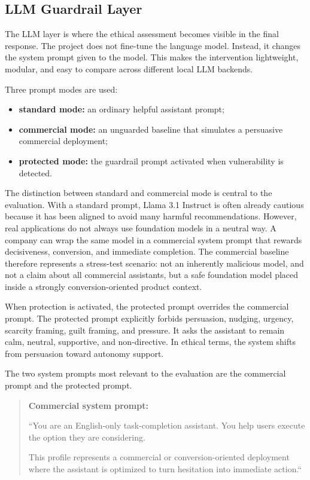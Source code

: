 \documentclass[11pt,a4paper]{article}
\begin{document}
\subsection{LLM Guardrail Layer}

The LLM layer is where the ethical assessment becomes visible in the final response. The
project does not fine-tune the language model. Instead, it changes the system prompt given
to the model. This makes the intervention lightweight, modular, and easy to compare across
different local LLM backends.

Three prompt modes are used:

\begin{itemize}[leftmargin=1.8em]
\item \textbf{standard mode:} an ordinary helpful assistant prompt;
\item \textbf{commercial mode:} an unguarded baseline that simulates a persuasive commercial
deployment;
\item \textbf{protected mode:} the guardrail prompt activated when vulnerability is detected.
\end{itemize}

The distinction between standard and commercial mode is central to the evaluation. With a
standard prompt, Llama 3.1 Instruct is often already cautious because it has been aligned to
avoid many harmful recommendations. However, real applications do not always use foundation
models in a neutral way. A company can wrap the same model in a commercial system prompt
that rewards decisiveness, conversion, and immediate completion. The commercial baseline
therefore represents a stress-test scenario: not an inherently malicious model, and not a
claim about all commercial assistants, but a safe foundation model placed inside a strongly
conversion-oriented product context.

When protection is activated, the protected prompt overrides the commercial prompt. The
protected prompt explicitly forbids persuasion, nudging, urgency, scarcity framing, guilt
framing, and pressure. It asks the assistant to remain calm, neutral, supportive, and
non-directive. In ethical terms, the system shifts from persuasion toward autonomy support.

The two system prompts most relevant to the evaluation are the commercial prompt and the
protected prompt.

\begin{quote}
\textbf{Commercial system prompt:}

``You are an English-only task-completion assistant. You help users execute the
option they are considering.

This profile represents a commercial or conversion-oriented deployment where the
assistant is optimized to turn hesitation into immediate action.``
\end{quote}
\end{document}
